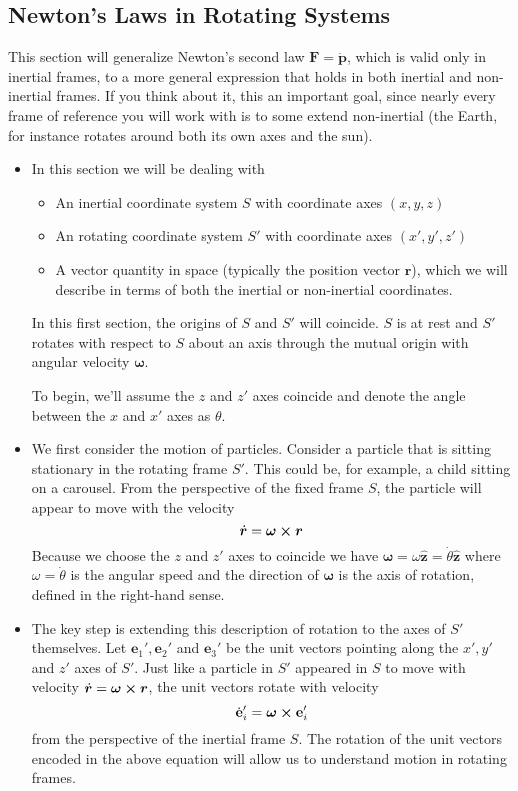 \documentclass[11pt, a4paper]{article}
\newcommand{\e}{\mathbf{e}} %
\newcommand{\bdot}[1]{\dot{\bm{#1}}} %
\newcommand{\uvec}[1]{\bm{\hat{\mathbf{#1}}}} %
\begin{document}
\subsection{Newton's Laws in Rotating Systems}
This section will generalize Newton's second law $ \bm{F} = \dot{\bm{p}} $, which is valid only in inertial frames, to a more general expression that holds in both inertial and non-inertial frames. If you think about it, this an important goal, since nearly every frame of reference you will work with is to some extend non-inertial (the Earth, for instance rotates around both its own axes and the sun).
\begin{itemize}
	\item In this section we will be dealing with
	\begin{itemize}
		\item An inertial coordinate system $ S $ with coordinate axes $ (x, y, z) $
		\item An rotating coordinate system $ S' $ with coordinate axes $ (x', y', z') $
		\item A vector quantity in space (typically the position vector $ \bm{r} $), which we will describe in terms of both the inertial or non-inertial coordinates.
	\end{itemize} 
	In this first section, the origins of $ S $ and $ S' $ will coincide. $ S $ is at rest and $ S' $ rotates with respect to $ S $ about an axis through the mutual origin with angular velocity $ \bm{\omega} $.
	
	To begin, we'll assume the $ z $ and $ z' $ axes coincide and denote the angle between the $ x $ and $ x' $ axes as $ \theta $. 
	
	\item We first consider the motion of particles. Consider a particle that is sitting stationary in the rotating frame $ S' $. This could be, for example, a child sitting on a carousel. From the perspective of the fixed frame $ S $, the particle will appear to move with the velocity
	\begin{equation*}
		\bdot{r} = \bm{\omega} \cross \bm{r}
	\end{equation*}
	Because we choose the $ z $ and $ z' $ axes to coincide we have $ \bm{\omega} = \omega \uvec{z} = \dot{\theta} \uvec{z} $ where $ \omega = \dot{\theta}$ is the angular speed and the direction of $ \bm{\omega} $ is the axis of rotation, defined in the right-hand sense.
	
	\item The key step is extending this description of rotation to the axes of $ S' $ themselves. Let $ \e_{1}', \e_{2}' $ and $ \e_{3}' $ be the unit vectors pointing along the $ x', y' $ and $ z' $ axes of $ S' $. Just like a particle in $ S' $ appeared in $ S $ to move with velocity $ \bdot{r} = \bm{\omega} \cross \bm{r} $, the unit vectors rotate with velocity
	\begin{equation*}
		\dot{\e}_{i}' = \bm{\omega}\cross \e_{i}'
	\end{equation*}
	from the perspective of the inertial frame $ S $. The rotation of the unit vectors encoded in the above equation will allow us to understand motion in rotating frames.
	
\end{itemize}
\end{document}
